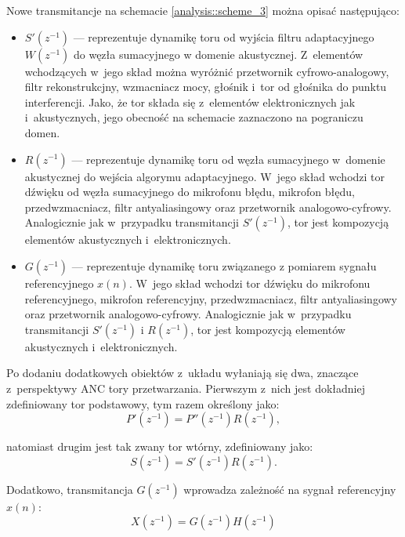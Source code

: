 Nowe transmitancje na schemacie \ref{analysis::scheme_3} można opisać
następująco:

\begin{itemize}

\item $S'(z^{-1})$ --- reprezentuje dynamikę toru od wyjścia filtru
adaptacyjnego $W(z^{-1})$ do węzła sumacyjnego w domenie akustycznej.
Z~elementów wchodzących w~jego skład można wyróżnić przetwornik
cyfrowo-analogowy, filtr rekonstrukcjny, wzmacniacz mocy, głośnik i~tor od
głośnika do punktu interferencji. Jako, że tor składa się z~elementów
elektronicznych jak i~akustycznych, jego obecność na schemacie zaznaczono na
pograniczu domen.

\item $R(z^{-1})$ --- reprezentuje dynamikę toru od węzła sumacyjnego w~domenie
akustycznej do wejścia algorymu adaptacyjnego. W~jego skład wchodzi tor dźwięku
od węzła sumacyjnego do mikrofonu błędu, mikrofon błędu, przedwzmacniacz, filtr
antyaliasingowy oraz przetwornik analogowo-cyfrowy. Analogicznie jak w~przypadku
transmitancji $S'(z^{-1})$, tor jest kompozycją elementów akustycznych
i~elektronicznych.

\item $G(z^{-1})$ --- reprezentuje dynamikę toru związanego z pomiarem sygnału
referencyjnego $x(n)$. W~jego skład wchodzi tor dźwięku do mikrofonu
referencyjnego, mikrofon referencyjny, przedwzmacniacz, filtr antyaliasingowy
oraz przetwornik analogowo-cyfrowy. Analogicznie jak w~przypadku transmitancji
$S'(z^{-1})$ i $R(z^{-1})$, tor jest kompozycją elementów akustycznych i~elektronicznych.

\end{itemize}

Po dodaniu dodatkowych obiektów z~układu wyłaniają się dwa, znaczące
z~perspektywy ANC tory przetwarzania. Pierwszym z~nich jest dokładniej
zdefiniowany tor podstawowy, tym razem określony jako:
\begin{equation}
    P'(z^{-1}) = P''(z^{-1})R(z^{-1}),
    \label{eq::p}
\end{equation}

\noindent natomiast drugim jest tak zwany tor wtórny, zdefiniowany jako:
\begin{equation}
    S(z^{-1}) = S'(z^{-1})R(z^{-1}).
    \label{eq::s}
\end{equation}

Dodatkowo, transmitancja $G(z^{-1})$ wprowadza zależność na sygnał referencyjny
$x(n)$:
\begin{equation}
    X(z^{-1}) = G(z^{-1})H(z^{-1})
    \label{eq::x}
\end{equation}

